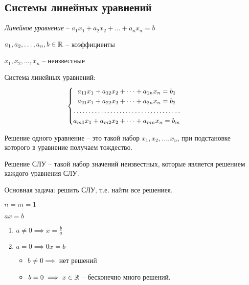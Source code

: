 \subsection{Системы линейных уравнений}

\textit{Линейное уравнение} -- $a_1 x_1 + a_2 x_2 + \dots + a_n x_n = b$

$a_1, a_2, \dots, a_n, b \in \mathbb{R}$ -- коэффициенты

$x_1, x_2, \dots, x_n$ -- неизвестные

Система линейных уравнений:
\begin{equation*}
    \begin{cases}
        \begin{matrix}
        a_{11} x_1 + a_{12} x_2 + \dots + a_{1n} x_n = b_1 \\
        a_{21} x_1 + a_{22} x_2 + \dots + a_{2n} x_n = b_2 \\
        \hdotsfor{1} \\
        a_{m1} x_1 + a_{m2} x_2 + \dots + a_{mn} x_n = b_m
        \end{matrix}
    \end{cases}
\end{equation*}

\begin{definition}
    Решение одного уравнение -- это такой набор $x_1, x_2, \dots, x_n$, при подстановке которого в уравнение получаем тождество.

    Решение СЛУ -- такой набор значений неизвестных, которые является решением каждого уравнения СЛУ.
\end{definition}

Основная задача: решить СЛУ, т.е. найти все решениея.

\begin{example}
    $n = m = 1$

    $ax = b$
    \begin{enumerate}[nosep]
    \item $a \neq 0 \implies x = \frac{b}{a}$
    \item 
        $a = 0 \implies 0x = b$
        \begin{itemize}[nosep]
        \item $b \neq 0 \implies$ нет решений
        \item $b = 0 \implies x \in \mathbb{R}$ -- бесконечно много решений.
        \end{itemize}
    \end{enumerate}
\end{example}


